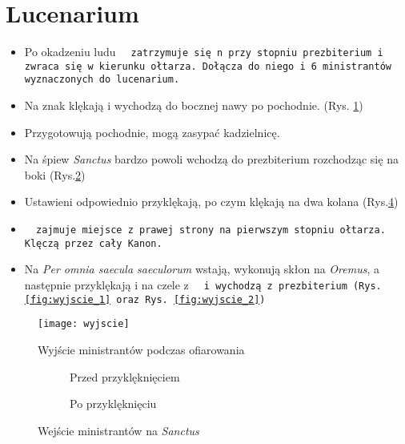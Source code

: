 \section{Lucenarium}


\begin{itemize}
	\item Po okadzeniu ludu \tt~ zatrzymuje się n przy stopniu prezbiterium i
	      zwraca się w kierunku ołtarza. Dołącza do niego  i 6 ministrantów
	      wyznaczonych do lucenarium.
	\item Na znak  klękają i wychodzą do bocznej nawy po pochodnie.	(Rys.
	      \ref{fig:wyjscie})
	\item Przygotowują pochodnie, mogą zasypać kadzielnicę.
	\item Na śpiew \textit{Sanctus} bardzo powoli wchodzą do prezbiterium
	      rozchodząc się na boki (Rys.\ref{fig:wejscie_1})
	\item Ustawieni odpowiednio przyklękają, po czym klękają na dwa kolana
	      (Rys.\ref{fig:wejscie_2})
	\item \tt~ zajmuje miejsce z prawej strony na pierwszym stopniu ołtarza.
	      Klęczą przez cały Kanon.
	\item Na \textit{Per omnia saecula saeculorum} wstają, wykonują skłon na
	      \textit{Oremus}, a następnie przyklękają i na czele z \tt~ i 
	      wychodzą z prezbiterium (Rys. \ref{fig:wyjscie_1} oraz Rys.
	      \ref{fig:wyjscie_2})
\end{itemize}

\begin{figure}[h]
	\centering
	\texttt{[image: wyjscie]}
	\caption{Wyjście ministrantów podczas ofiarowania}
	\label{fig:wyjscie}
\end{figure}

\begin{figure}[ht]
	\begin{subfigure}[t]{.5\linewidth}
		\centering\usebox{\imagebox}
		\caption{Przed przyklęknięciem}
		\label{fig:wejscie_1}
	\end{subfigure}\qquad
	\begin{subfigure}[t]{.5\linewidth}
		\centering{}%
		\caption{Po przyklęknięciu}
		\label{fig:wejscie_2}
	\end{subfigure}
	\caption{Wejście ministrantów na \textit{Sanctus}}
\end{figure}

